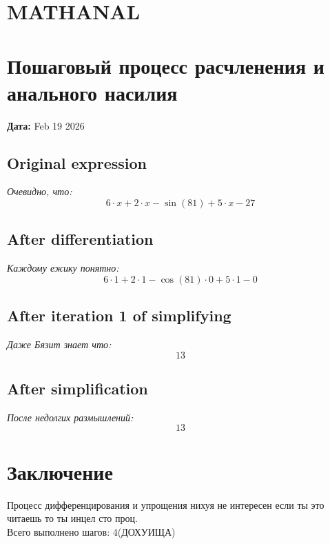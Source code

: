 \documentclass[12pt]{article}
\begin{document}
\section*{MATHANAL}

\section*{Пошаговый процесс расчленения и анального насилия}
\textbf{Дата:} Feb 19 2026\\
\vspace{0.5cm}

\subsection*{Original expression}
\textit{Очевидно, что:}\\
\begin{dmath}
6 \cdot x + 2 \cdot x - \sin(81) + 5 \cdot x - 27
\end{dmath}

\subsection*{After differentiation}
\textit{Каждому ежику понятно:}\\
\begin{dmath}
6 \cdot 1 + 2 \cdot 1 - \cos(81) \cdot 0 + 5 \cdot 1 - 0
\end{dmath}

\subsection*{After iteration 1 of simplifying}
\textit{Даже Бязит знает что:}\\
\begin{dmath}
13
\end{dmath}

\subsection*{After simplification}
\textit{После недолгих размышлений:}\\
\begin{dmath}
13
\end{dmath}

\section*{Заключение}
Процесс дифференцирования и упрощения нихуя не интересен если ты это читаешь то ты инцел сто проц.\\
Всего выполнено шагов: 4(ДОХУИЩА)\\
\vspace{0.5cm}
\end{document}
